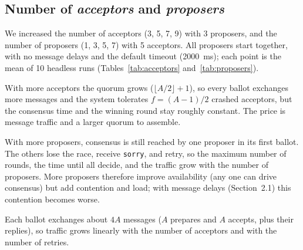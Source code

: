 \subsection{Number of \textit{acceptors} and \textit{proposers}}

We increased the number of acceptors (3, 5, 7, 9) with 3 proposers, and the
number of proposers (1, 3, 5, 7) with 5 acceptors. All proposers start
together, with no message delays and the default timeout (2000~ms); each point
is the mean of 10 headless runs (Tables~\ref{tab:acceptors}
and~\ref{tab:proposers}).



With more acceptors the quorum grows ($\lfloor A/2\rfloor+1$), so every ballot
exchanges more messages and the system tolerates $f=(A-1)/2$ crashed
acceptors, but the consensus time and the winning round stay roughly constant.
The price is message traffic and a larger quorum to assemble.

With more proposers, consensus is still reached by one proposer in its first
ballot. The others lose the race, receive \texttt{sorry}, and retry, so the
maximum number of rounds, the time until all decide, and the traffic grow with
the number of proposers. More proposers therefore improve availability (any
one can drive consensus) but add contention and load; with message delays
(Section~2.1) this contention becomes worse.

Each ballot exchanges about $4A$ messages ($A$ prepares and $A$ accepts, plus
their replies), so traffic grows linearly with the number of acceptors and
with the number of retries.
